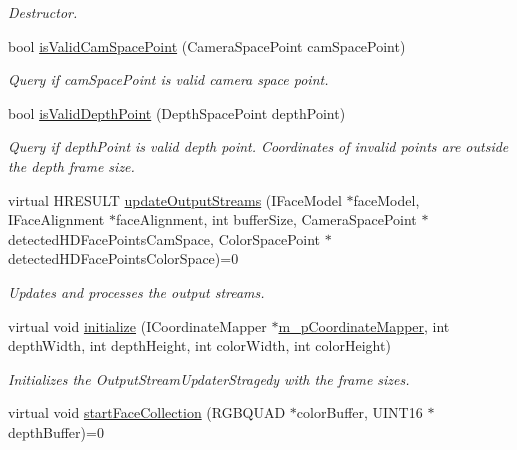 \begin{DoxyCompactItemize}
\begin{DoxyCompactList}\small\item\em Destructor. \end{DoxyCompactList}\item 
bool \hyperlink{class_output_streams_updater_stragedy_a1880ded54b27751d84401bdc2a638668}{is\+Valid\+Cam\+Space\+Point} (Camera\+Space\+Point cam\+Space\+Point)
\begin{DoxyCompactList}\small\item\em Query if \textquotesingle{}cam\+Space\+Point\textquotesingle{} is valid camera space point. \end{DoxyCompactList}\item 
bool \hyperlink{class_output_streams_updater_stragedy_ad22baa921eb2098e6059b0b0d41e1438}{is\+Valid\+Depth\+Point} (Depth\+Space\+Point depth\+Point)
\begin{DoxyCompactList}\small\item\em Query if \textquotesingle{}depth\+Point\textquotesingle{} is valid depth point. Coordinates of invalid points are outside the depth frame size. \end{DoxyCompactList}\item 
virtual H\+R\+E\+S\+U\+L\+T \hyperlink{class_output_streams_updater_stragedy_aab72baf9e0357eda8d10af52ef6046df}{update\+Output\+Streams} (I\+Face\+Model $\ast$face\+Model, I\+Face\+Alignment $\ast$face\+Alignment, int buffer\+Size, Camera\+Space\+Point $\ast$detected\+H\+D\+Face\+Points\+Cam\+Space, Color\+Space\+Point $\ast$detected\+H\+D\+Face\+Points\+Color\+Space)=0
\begin{DoxyCompactList}\small\item\em Updates and processes the output streams. \end{DoxyCompactList}\item 
virtual void \hyperlink{class_output_streams_updater_stragedy_a2eb4731e5dd15fa676ae1fe8ef4517af}{initialize} (I\+Coordinate\+Mapper $\ast$\hyperlink{class_output_streams_updater_stragedy_a3526d196182b8231f73ef97c49982579}{m\+\_\+p\+Coordinate\+Mapper}, int depth\+Width, int depth\+Height, int color\+Width, int color\+Height)
\begin{DoxyCompactList}\small\item\em Initializes the Output\+Stream\+Updater\+Stragedy with the frame sizes. \end{DoxyCompactList}\item 
virtual void \hyperlink{class_output_streams_updater_stragedy_ad9a1898edc4def60a68bf6105c241bcc}{start\+Face\+Collection} (R\+G\+B\+Q\+U\+A\+D $\ast$color\+Buffer, U\+I\+N\+T16 $\ast$depth\+Buffer)=0

\end{DoxyCompactItemize}
